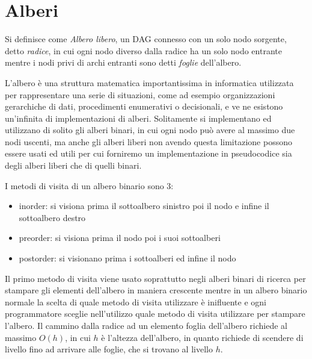 \section{Alberi}
Si definisce come \emph{Albero libero}, un DAG connesso con un solo nodo sorgente, detto \emph{radice}, in cui ogni nodo diverso dalla radice ha un solo nodo entrante
mentre i nodi privi di archi entranti sono detti \emph{foglie} dell'albero.\newline



L'albero è una struttura matematica importantissima in informatica utilizzata per rappresentare una serie di situazioni, come ad esempio organizzazioni gerarchiche di dati,
procedimenti enumerativi o decisionali, e ve ne esistono un'infinita di implementazioni di alberi.\newline
Solitamente si implementano ed utilizzano di solito gli alberi binari, in cui ogni nodo può avere al massimo due nodi uscenti, ma anche gli alberi liberi
non avendo questa limitazione possono essere usati ed utili per cui forniremo un implementazione in pseudocodice sia degli alberi liberi che di quelli binari.


I metodi di visita di un albero binario sono 3:
\begin{itemize}
  \item inorder: si visiona prima il sottoalbero sinistro poi il nodo e infine il sottoalbero destro
  \item preorder: si visiona prima il nodo poi i suoi sottoalberi
  \item postorder: si visionano prima i sottoalberi ed infine il nodo
\end{itemize}
Il primo metodo di visita viene usato soprattutto negli alberi binari di ricerca per
stampare gli elementi dell'albero in maniera crescente mentre in un albero binario
normale la scelta di quale metodo di visita utilizzare è inifluente e ogni programmatore
sceglie nell'utilizzo quale metodo di visita utilizzare per stampare l'albero.
Il cammino dalla radice ad un elemento foglia dell'albero richiede al massimo $O(h)$,
in cui $h$ è l'altezza dell'albero, in quanto richiede di scendere di livello fino
ad arrivare alle foglie, che si trovano al livello $h$.

